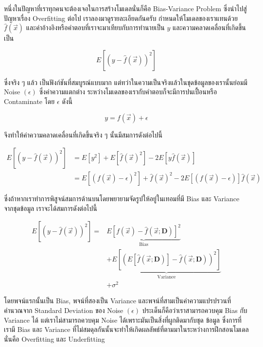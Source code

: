 หนึ่งในปัญหาที่เราทุกคนจะต้องเจอในการสร้างโมเดลนั่นก็คือ Bias-Variance Problem ซึ่งนำไปสู่ปัญหาเรื่อง Overfitting ต่อไป
เราลองมาดูรายละเอียดกันครับ กำหนดให้โมเดลของเราแทนด้วย $\hat{f}(\vec{x})$ และค่าอ้างอิงหรือคำตอบที่เราจะมาเทียบกับการทำนายเป็น 
$y$ และความคลาดเคลื่อนที่เกิดขึ้นเป็น

\begin{equation}
    E\left[\left(y - \hat{f}(\vec{x})\right)^2\right]
\end{equation}

ซึ่งจริง ๆ แล้ว เป็นฟังก์ชันที่สมบูรณ์แบบมาก แต่ทว่าในความเป็นจริงแล้วในชุดข้อมูลของเรานั้นย่อมมี Noise $(\epsilon)$ ซึ่งค่าความแตกต่าง%
ระหว่างโมเดลของเรากับคำตอบก็จะมีการปนเปื้อนหรือ Contaminate โดย $\epsilon$ ดังนี้

\begin{equation}
    y = f(\vec{x}) + \epsilon
\end{equation}

\noindent จึงทำให้ค่าความคลาดเคลื่อนที่เกิดขึ้นจริง ๆ นั้นมีสมการดังต่อไปนี้ 

\begin{align}
    E\left[\left(y - \hat{f}(\vec{x})\right)^2\right] &= 
    E\left[y^2\right] + E\left[\hat{f}(\vec{x})^2\right] - 2 E\left[y\hat{f}(\vec{x})\right] \\
    &= E\left[\left(f(\vec{x}) - \epsilon\right)^2\right] + \hat{f}(\vec{x})^2 - 2 E\left[\left(f(\vec{x}) - 
    \epsilon\right)\right]\hat{f}(\vec{x})
\end{align}

\noindent ซึ่งถ้าหากเราทำการพิสูจน์สมการด้านบนโดยพยายามจัดรูปให้อยู่ในเทอมที่มี Bias และ Variance จากชุดข้อมูล เราจะได้สมการดังต่อไปนี้

\begin{align}\label{eq:bias_variance}
E\left[\left(y - \hat{f}(\vec{x})\right)^2\right] = 
    & \underbrace{E\left[f(\vec{x}) - \hat{f}\left(\vec{x}; \bm{D}\right)\right]^2}_{\text{Bias}} \nonumber \\
    & + \underbrace{E\left[\left(E\left[\hat{f}\left(\vec{x}; \bm{D}\right)\right] - 
    \hat{f}\left(\vec{x}; \bm{D}\right)\right)^2\right]}_{\text{Variance}} \nonumber \\
    & + \sigma^2
\end{align}

โดยพจน์แรกนั้นเป็น Bias, พจน์ที่สองเป็น Variance และพจน์ที่สามเป็นค่าความแปรปรวนที่คำนวณจาก Standard Deviation ของ Noise 
$(\epsilon)$ ประเด็นก็คือว่าเราสามารถควบคุม Bias กับ Variance ได้ แต่เราไม่สามารถควบคุม Noise ได้เพราะมันเป็นสิ่งที่ผูกติดมากับชุด%
ข้อมูล ซึ่งการที่เรามี Bias และ Variance ที่ไม่สมดุลกันนั้นจะทำให้เกิดผลลัพธ์ที่ตามมาในระหว่างการฝึกสอนโมเดล นั่นคือ Overfitting และ 
Underfitting


